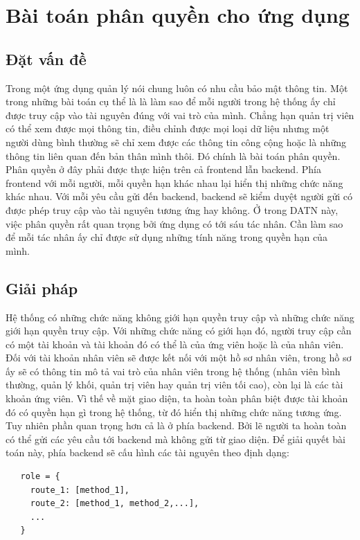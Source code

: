 \documentclass[../DoAn.tex]{subfiles}
\begin{document}
\section{Bài toán phân quyền cho ứng dụng}
\subsection{Đặt vấn đề}
Trong một ứng dụng quản lý nói chung luôn có nhu cầu bảo mật thông tin. Một trong những bài toán cụ thể là là làm sao để mỗi người trong hệ thống ấy chỉ được truy cập vào tài nguyên đúng với vai trò của mình. Chẳng hạn quản trị viên có thể xem được mọi thông tin, điều chỉnh được mọi loại dữ liệu nhưng một người dùng bình thường sẽ chỉ xem được các thông tin công cộng hoặc là những thông tin liên quan đến bản thân mình thôi. Đó chính là bài toán phân quyền. Phân quyền ở đây phải được thực hiện trên cả frontend lẫn backend. Phía frontend với mỗi người, mỗi quyền hạn khác nhau lại hiển thị những chức năng khác nhau. Với mỗi yêu cầu gửi đến backend, backend sẽ kiểm duyệt người gửi có được phép truy cập vào tài nguyên tương ứng hay không. Ở trong DATN này, việc phân quyền rất quan trọng bởi ứng dụng có tới sáu tác nhân. Cần làm sao để mỗi tác nhân ấy chỉ được sử dụng những tính năng trong quyền hạn của mình.

\subsection{Giải pháp}
Hệ thống có những chức năng không giới hạn quyền truy cập và những chức năng giới hạn quyền truy cập. Với những chức năng có giới hạn đó, người truy cập cần có một tài khoản và tài khoản đó có thể là của ứng viên hoặc là của nhân viên. Đối với tài khoản nhân viên sẽ được kết nối với một hồ sơ nhân viên, trong hồ sơ ấy sẽ có thông tin mô tả vai trò của nhân viên trong hệ thống (nhân viên bình thường, quản lý khối, quản trị viên hay quản trị viên tối cao), còn lại là các tài khoản ứng viên. Vì thế về mặt giao diện, ta hoàn toàn phân biệt được tài khoản đó có quyền hạn gì trong hệ thống, từ đó hiển thị những chức năng tương ứng. Tuy nhiên phần quan trọng hơn cả là ở phía backend. Bởi lẽ người ta hoàn toàn có thể gửi các yêu cầu tới backend mà không gửi từ giao diện. Để giải quyết bài toán này, phía backend sẽ cấu hình các tài nguyên theo định dạng:

\begin{verbatim}
   role = {
     route_1: [method_1],
     route_2: [method_1, method_2,...],
     ...
   }
\end{verbatim}
\end{document}
